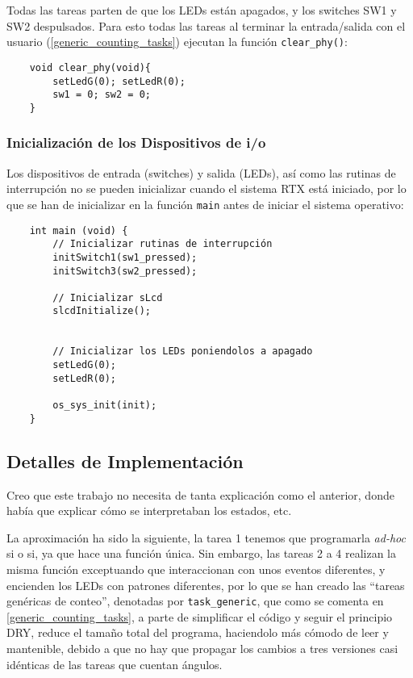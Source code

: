 \documentclass[a4paper,openright,12pt]{article}
\begin{document}
Todas las tareas parten de que los LEDs están apagados, y los switches SW1 y SW2 despulsados. Para esto todas las tareas al terminar la entrada/salida con el usuario
(\ref{generic_counting_tasks}) ejecutan la función \texttt{clear\_phy()}:
\begin{samepage}
\begin{verbatim}
    void clear_phy(void){
        setLedG(0); setLedR(0);
        sw1 = 0; sw2 = 0;
    }
\end{verbatim}
\end{samepage}

\subsubsection{Inicialización de los Dispositivos de i/o}
Los dispositivos de entrada (switches) y salida (LEDs), así como las rutinas de interrupción no se pueden inicializar cuando el sistema RTX está iniciado, por lo que se han de
inicializar en la función \texttt{main} antes de iniciar el sistema operativo:
\begin{verbatim}
    int main (void) {
        // Inicializar rutinas de interrupción
        initSwitch1(sw1_pressed);
        initSwitch3(sw2_pressed);
        
        // Inicializar sLcd
        slcdInitialize();
        

        // Inicializar los LEDs poniendolos a apagado
        setLedG(0);
        setLedR(0);
        
        os_sys_init(init);
    }
\end{verbatim}



\subsection{Detalles de Implementación}
Creo que este trabajo no necesita de tanta explicación como el anterior, donde había que explicar cómo se interpretaban los estados, etc.

La aproximación ha sido la siguiente, la tarea 1 tenemos que programarla \emph{ad-hoc} si o si, ya que hace una función única. Sin embargo, las tareas 2 a 4 realizan la misma función
exceptuando que interaccionan con unos eventos diferentes, y encienden los LEDs con patrones diferentes, por lo que se han creado las ``tareas genéricas de conteo'', denotadas por
\texttt{task\_generic}, que como se comenta en \ref{generic_counting_tasks}, a parte de simplificar el código y seguir el principio DRY, reduce el tamaño total del programa, haciendolo
más cómodo de leer y mantenible, debido a que no hay que propagar los cambios a tres versiones casi idénticas de las tareas que cuentan ángulos.
\end{document}
